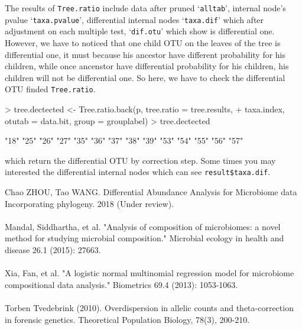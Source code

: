 \documentclass[a4paper]{article}
\newcommand{\code}{\texttt}
\begin{document}
The results of \code{Tree.ratio} include data after pruned `\texttt{alltab}', internal node's pvalue `\texttt{taxa.pvalue}', differential internal nodes `\texttt{taxa.dif}' which after adjustment on each multiple test, `\texttt{dif.otu}' which show is differential one. However, we have to noticed that one child OTU on the leaves of the tree is differential one, it must because his ancestor have different probability for his children, while once ancenstor have differential probability for his children, his children will not be differential one. So here, we have to check the differential OTU finded \code{Tree.ratio}.


\begin{Schunk}
\begin{Sinput}
> tree.dectected <- Tree.ratio.back(p, tree.ratio = tree.results,
+                       taxa.index, otutab = data.bit, group = grouplabel)
> tree.dectected
\end{Sinput}
\begin{Soutput}
 [1] "18" "25" "26" "27" "35" "36" "37" "38" "39" "53" "54" "55" "56" "57"
\end{Soutput}
\end{Schunk}

which return the differential OTU by correction step. Some times you may interested the differential internal nodes which can see \code{result\$taxa.dif}.



\begin{thebibliography}{99}
Chao ZHOU, Tao WANG. Differential Abundance Analysis for Microbiome data Incorporating phylogeny. 2018 (Under review).\\
\\
Mandal, Siddhartha, et al. "Analysis of composition of microbiomes: a novel method for studying microbial composition." Microbial ecology in health and disease 26.1 (2015): 27663.\\
\\
Xia, Fan, et al. "A logistic normal multinomial regression model for microbiome compositional data analysis." Biometrics 69.4 (2013): 1053-1063.\\
\\
Torben Tvedebrink (2010). Overdispersion in allelic counts and theta-correction in forensic genetics. Theoretical Population Biology, 78(3), 200-210.\\

\end{thebibliography}
\end{document}

